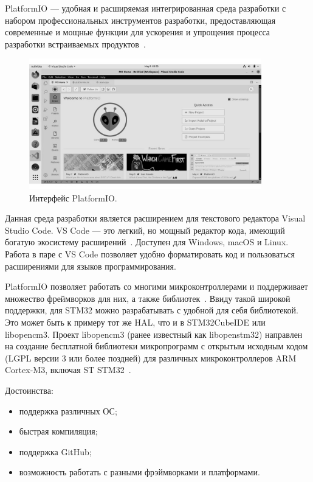 	PlatformIO --- удобная и расширяемая интегрированная среда разработки с набором профессиональных инструментов разработки, предоставляющая современные и мощные функции для ускорения и упрощения процесса разработки встраиваемых продуктов~\cite{plio}.
	
	\begin{figure}[h]
    \centering
    \includegraphics[width=0.9\textwidth]{../image/plio.jpg}
    \caption{Интерфейс PlatformIO.}
	\end{figure}
	
	Данная среда разработки является расширением для текстового редактора Visual Studio Code. VS Code --- это легкий, но мощный редактор кода, имеющий богатую экосистему расширений~\cite{vscode}. Доступен для Windows, macOS и Linux. Работа в паре с VS Code позволяет удобно форматировать код и пользоваться расширениями для языков программирования.
	
	PlatformIO позволяет работать со многими микроконтроллерами и поддерживает множество фреймворков для них, а также библиотек~\cite{docsplio}. Ввиду такой широкой поддержки, для STM32 можно разрабатывать с удобной для себя библиотекой. Это может быть к примеру тот же HAL, что и в STM32CubeIDE или libopencm3. Проект libopencm3 (ранее известный как libopenstm32) направлен на создание бесплатной библиотеки микропрограмм с открытым исходным кодом (LGPL версии 3 или более поздней) для различных микроконтроллеров ARM Cortex-M3, включая ST STM32~\cite{lcm3}.


	Достоинства:
	\begin{itemize}
		\item поддержка различных ОС;
		\item быстрая компиляция;
		\item поддержка GitHub;
		\item возможность работать с разными фрэймворками и платформами.
	\end{itemize}
	
